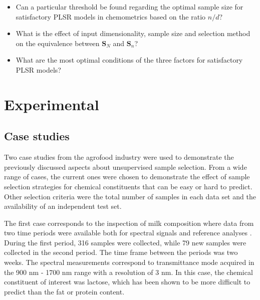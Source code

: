 \documentclass[journal=ancham,manuscript=article]{achemso}
\begin{document}
\begin{itemize}

    \item Can a particular threshold be found regarding the optimal sample size for satisfactory PLSR models in chemometrics based on the ratio $n/d$?

    \item What is the effect of input dimensionality, sample size and selection method on the equivalence between $\mathbf{S}_N$ and $\mathbf{S}_n$?
    
    \item What are the most optimal conditions of the three factors for satisfactory PLSR models?

\end{itemize}


\section{Experimental}\label{experimental}

\subsection{Case studies}\label{data}

Two case studies from the agrofood industry were used to demonstrate the previously discussed aspects about unsupervised sample selection. From a wide range of cases, the current ones were chosen to demonstrate the effect of sample selection strategies for chemical constituents that can be easy or hard to predict. Other selection criteria were the total number of samples in each data set and the availability of an independent test set. 

The first case corresponds to the inspection of milk composition where data from two time periods were available both for spectral signals and reference analyses \cite{Diaz-Olivares2020}. During the first period, 316 samples were collected, while 79 new samples were collected in the second period. The time frame between the periods was two weeks. The spectral measurements correspond to transmittance mode acquired in the 900 nm - 1700 nm range with a resolution of 3 nm. In this case, the chemical constituent of interest was lactose, which has been shown to be more difficult to predict than the fat or protein content\cite{Aernouts2011}.
\end{document}
